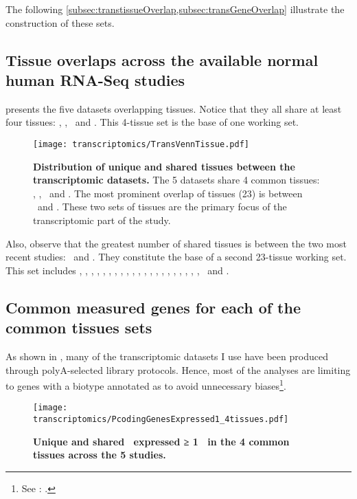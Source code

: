 The following \cref{subsec:transtissueOverlap,subsec:transGeneOverlap}
illustrate the construction of these sets.

\subsection{Tissue overlaps across the available normal human RNA-Seq studies}%
\label{subsec:transtissueOverlap}

 presents the five datasets overlapping tissues.
Notice that they all share at least four tissues:
\heart, \kidney, \liver\ and \testis.
This 4-tissue set is the base of one working set.

\begin{figure}[h]%
\texttt{[image: transcriptomics/TransVennTissue.pdf]}\centering
\caption[Distribution of unique and shared tissues between the
transcriptomic datasets]
{\label{fig:VennStudiesT}\textbf{Distribution of unique and shared tissues
between the transcriptomic datasets.} The 5 datasets share 4
common tissues: \heart, \kidney, \liver\ and \testis.
The most prominent overlap of tissues (23) is between \uhlen\ and \gtex.
These two sets of tissues are the primary focus of the transcriptomic part of the
study.}
\end{figure}

Also, observe that the greatest number of shared tissues is
between the two most recent studies:
\uhlen\ and \gtex.
They constitute the base of a second 23-tissue working set.
This set includes
\Adipose, \Adrenal, \Bladder, \Cortex, \hcolon, \Esophagus,
\Fallopian, \heart, \kidney, \liver, \lung, \Ovary, \Pancreas, \Prostate,
\salivary, \skeletal, \skin, \intestine, \spleen, \stomach, \testis,
\thyroid\ and \uterus.

\subsection{Common measured genes for each of the common tissues sets}%
\label{subsec:transGeneOverlap}
As shown in ,
many of the transcriptomic datasets I use have been produced through
polyA-selected library protocols.
Hence, most of the analyses are limiting to genes with a biotype annotated as
\emph{\pc}
to avoid unnecessary biases\footnote{See
: .}.

\begin{figure}[!htpb]
    \texttt{[image: transcriptomics/PcodingGenesExpressed1\_4tissues.pdf]}\centering
    \caption[Unique and shared \pcgs\ expressed
    in the 4 common tissues (≥1 \FPKM)]{\label{fig:ExpGenePcoding1}\textbf{Unique
    and shared \pcgs\ expressed ≥ 1 \FPKM\ in the 4 common tissues
    across the 5 studies.}}
\end{figure}


